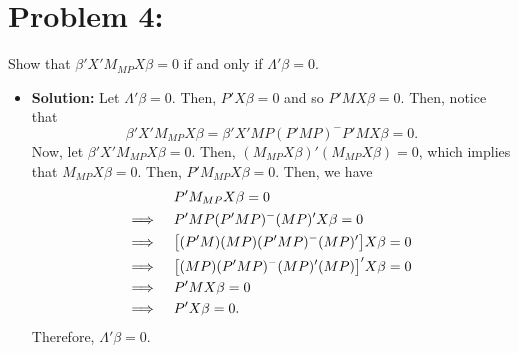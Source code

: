 \documentclass[11pt]{article}
\begin{document}
\section*{Problem 4:}  Show that $\beta'X'M_{MP}X\beta = 0$ if and only if $\Lambda'\beta = 0$.
\begin{itemize}
\item[] {\bf Solution:}  Let $\Lambda'\beta = 0$.  Then, $P'X\beta = 0$ and so $P'MX\beta = 0$.  Then, notice that
\[
\beta' X'M_{MP}X\beta = \beta'X'MP(P'MP)^-P'MX\beta = 0.
\]
Now, let $\beta'X'M_{MP}X\beta = 0$.  Then, $(M_{MP}X\beta)'(M_{MP}X\beta) = 0$, which implies that $M_{MP}X\beta = 0$.  Then, $P'M_{MP}X\beta = 0$.  Then, we have
\begin{align*}
&P'M_{MP}X\beta = 0 \\
\Longrightarrow \hspace{5mm}& P'MP(P'MP)^-(MP)'X\beta = 0 \\
\Longrightarrow \hspace{5mm} & \big{[}(P'M)(MP)(P'MP)^-(MP)'\big{]} X\beta = 0 \\
\Longrightarrow \hspace{5mm} & \big{[}(MP)(P'MP)^-(MP)'(MP)\big{]}'X\beta = 0 \\
\Longrightarrow \hspace{5mm} & P'MX\beta = 0 \\
\Longrightarrow \hspace{5mm} & P'X\beta = 0.
\end{align*}
Therefore, $\Lambda'\beta = 0$.
\end{itemize}
\end{document}
